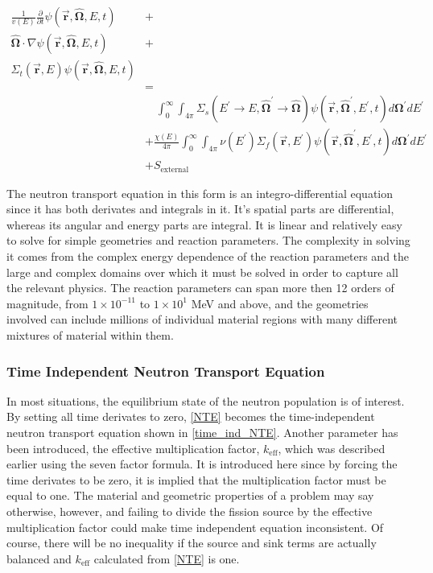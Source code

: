 \begin{equation}
\label{NTE}
\begin{split}
\frac{1}{v(E)} \frac{\partial }{\partial t}\psi(\boldsymbol{\vec{r}},\boldsymbol{\hat{\Omega}},E,t) &+  \\
\boldsymbol{\hat{\Omega}}  \cdot \nabla \psi(\boldsymbol{\vec{r}},\boldsymbol{\hat{\Omega}},E,t) &+ \\
\Sigma_t(\boldsymbol{\vec{r}},E) \psi(\boldsymbol{\vec{r}},\boldsymbol{\hat{\Omega}},E,t) & \\
& =  \\
& \quad \int_0^\infty  \int_{4\pi} \Sigma_s(E^\prime \rightarrow E,\boldsymbol{\hat{\Omega}}^\prime \rightarrow \boldsymbol{\hat{\Omega}}) \psi(\boldsymbol{\vec{r}},\boldsymbol{\hat{\Omega}}^\prime,E^\prime,t) d\boldsymbol{\Omega}^\prime dE^\prime  \\
&+ \frac{\chi(E)}{4\pi} \int_0^\infty  \int_{4\pi}   \nu(E^\prime) \Sigma_f(\boldsymbol{\vec{r}},E^\prime) \psi(\boldsymbol{\vec{r}},\boldsymbol{\hat{\Omega}}^\prime,E^\prime,t) d\boldsymbol{\Omega}^\prime  dE^\prime\\
& + S_{\mathrm{external}}
\end{split}
 \end{equation}
 
 The neutron transport equation in this form is an integro-differential equation since it has both derivates and integrals in it.  It's spatial parts are differential, whereas its angular and energy parts are integral.  It is linear and relatively easy to solve for simple geometries and reaction parameters.  The complexity in solving it comes from the complex energy dependence of the reaction parameters and the large and complex domains over which it must be solved in order to capture all the relevant physics.  The reaction parameters can span more then 12 orders of magnitude, from $1\times 10 ^{-11}$ to $1\times 10 ^{1}$ MeV and above, and the geometries involved can include millions of individual material regions with many different mixtures of material within them.
 
 \subsubsection{Time Independent Neutron Transport Equation}

In most situations, the equilibrium state of the neutron population is of interest.  By setting all time derivates to zero, \eqref{NTE} becomes the time-independent neutron transport equation shown in \eqref{time_ind_NTE}.  Another parameter has been introduced, the effective multiplication factor, $k_\mathrm{eff}$, which was described earlier using the seven factor formula.  It is introduced here since by forcing the time derivates to be zero, it is implied that the multiplication factor must be equal to one.  The material and geometric properties of a problem may say otherwise, however, and failing to divide the fission source by the effective multiplication factor could make time independent equation inconsistent.  Of course, there will be no inequality if the source and sink terms are actually balanced and $k_\mathrm{eff}$ calculated from \eqref{NTE} is one.


